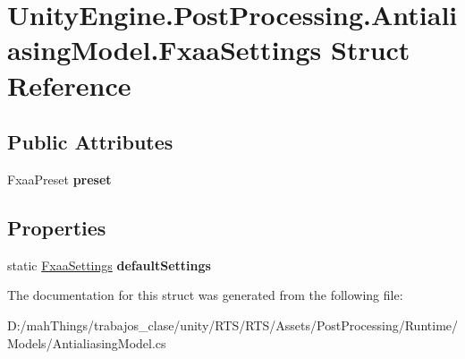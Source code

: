 \hypertarget{struct_unity_engine_1_1_post_processing_1_1_antialiasing_model_1_1_fxaa_settings}{}\section{Unity\+Engine.\+Post\+Processing.\+Antialiasing\+Model.\+Fxaa\+Settings Struct Reference}
\label{struct_unity_engine_1_1_post_processing_1_1_antialiasing_model_1_1_fxaa_settings}
\subsection*{Public Attributes}
\begin{DoxyCompactItemize}
\item 
\mbox{\label{struct_unity_engine_1_1_post_processing_1_1_antialiasing_model_1_1_fxaa_settings_a3891e742e96eb912e7557eb8c0fef920}} 
Fxaa\+Preset {\bfseries preset}
\end{DoxyCompactItemize}
\subsection*{Properties}
\begin{DoxyCompactItemize}
\item 
\mbox{\label{struct_unity_engine_1_1_post_processing_1_1_antialiasing_model_1_1_fxaa_settings_af1057b60af6b18d48a1f9df7a4de9331}} 
static \mbox{\hyperlink{struct_unity_engine_1_1_post_processing_1_1_antialiasing_model_1_1_fxaa_settings}{Fxaa\+Settings}} {\bfseries default\+Settings}
\end{DoxyCompactItemize}


The documentation for this struct was generated from the following file\+:\begin{DoxyCompactItemize}
\item 
D\+:/mah\+Things/trabajos\+\_\+clase/unity/\+R\+T\+S/\+R\+T\+S/\+Assets/\+Post\+Processing/\+Runtime/\+Models/Antialiasing\+Model.\+cs\end{DoxyCompactItemize}
